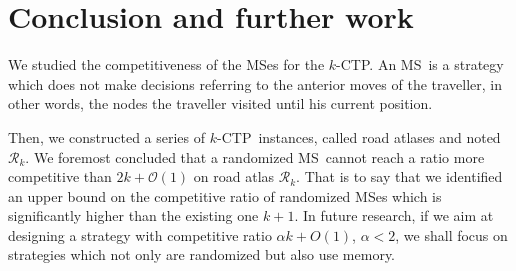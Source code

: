 \documentclass[preprint]{elsarticle}
\newcommand{\kctp}{$k$-CTP}
\newcommand{\mcalr}{\mathcal{R}}
\newcommand{\mts}{MS}
\begin{document}
\section{Conclusion and further work} \label{sec:conclusion}

We studied the competitiveness of the \mts es for the \kctp. An \mts ~is a strategy which does not make decisions referring to the anterior moves of the traveller, in other words, the nodes the traveller visited until his current position.

Then, we constructed a series of \kctp ~instances, called road atlases and noted $\mcalr_k$. 
We foremost concluded that a randomized  \mts ~cannot reach a ratio more competitive than $2k+\mathcal{O}\left(1\right)$ on road atlas $\mcalr_k$. That is to say that we identified an upper bound on the competitive ratio of randomized \mts{}es which is significantly higher than the existing one $k+1$. In future research, if we aim at designing a strategy with competitive ratio $\alpha k + O\left(1\right)$, $\alpha < 2$, we shall focus on strategies which not only are randomized but also use memory.



\end{document}

